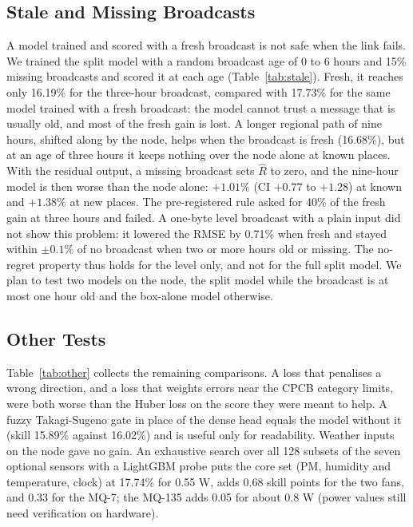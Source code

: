 \documentclass[journal]{IEEEtran}
\begin{document}
\subsection{Stale and Missing Broadcasts}
A model trained and scored with a fresh broadcast is not safe when the link fails. We trained the split model with a random broadcast age of 0 to 6 hours and 15\% missing broadcasts and scored it at each age (Table~\ref{tab:stale}). Fresh, it reaches only 16.19\% for the three-hour broadcast, compared with 17.73\% for the same model trained with a fresh broadcast: the model cannot trust a message that is usually old, and most of the fresh gain is lost. A longer regional path of nine hours, shifted along by the node, helps when the broadcast is fresh (16.68\%), but at an age of three hours it keeps nothing over the node alone at known places. With the residual output, a missing broadcast sets $\hat R$ to zero, and the nine-hour model is then worse than the node alone: $+1.01\%$ (CI $+0.77$ to $+1.28$) at known and $+1.38\%$ at new places. The pre-registered rule asked for 40\% of the fresh gain at three hours and failed. A one-byte level broadcast with a plain input did not show this problem: it lowered the RMSE by 0.71\% when fresh and stayed within $\pm0.1\%$ of no broadcast when two or more hours old or missing. The no-regret property thus holds for the level only, and not for the full split model. We plan to test two models on the node, the split model while the broadcast is at most one hour old and the box-alone model otherwise.

\begin{table}[!htb]
\caption{Skill (\%) of the Split Model Trained for Random Broadcast Age, by Age of the Broadcast at Test Time (Hours; ``Miss.'' = No Broadcast)}
\label{tab:stale}
\centering\footnotesize
\setlength{\tabcolsep}{2.5pt}

\end{table}

\subsection{Other Tests}
\label{sec:other}
Table~\ref{tab:other} collects the remaining comparisons. A loss that penalises a wrong direction, and a loss that weights errors near the CPCB category limits, were both worse than the Huber loss on the score they were meant to help. A fuzzy Takagi-Sugeno gate in place of the dense head equals the model without it (skill 15.89\% against 16.02\%) and is useful only for readability. Weather inputs on the node gave no gain. An exhaustive search over all 128 subsets of the seven optional sensors with a LightGBM probe puts the core set (PM, humidity and temperature, clock) at 17.74\% for 0.55 W, adds 0.68 skill points for the two fans, and 0.33 for the MQ-7; the MQ-135 adds 0.05 for about 0.8 W (power values still need verification on hardware).
\end{document}
